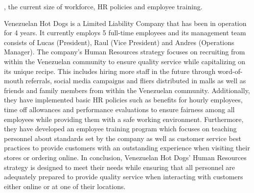 , the current size of workforce, HR policies and employee training.

Venezuelan Hot Dogs is a Limited Liability Company that has been in operation for 4 years. It currently employs 5 full-time employees and its management team consists of Lucas (President), Raul (Vice President) and Andres (Operations Manager). The company's Human Resources strategy focuses on recruiting from within the Venezuelan community to ensure quality service while capitalizing on its unique recipe. This includes hiring more staff in the future through word-of-mouth referrals, social media campaigns and fliers distributed in malls as well as friends and family members from within the Venezuelan community. Additionally, they have implemented basic HR policies such as benefits for hourly employees, time off allowances and performance evaluations to ensure fairness among all employees while providing them with a safe working environment. Furthermore, they have developed an employee training program which focuses on teaching personnel about standards set by the company as well as customer service best practices to provide customers with an outstanding experience when visiting their stores or ordering online.  In conclusion, Venezuelan Hot Dogs' Human Resources strategy is designed to meet their needs while ensuring that all personnel are adequately prepared to provide quality service when interacting with customers either online or at one of their locations.